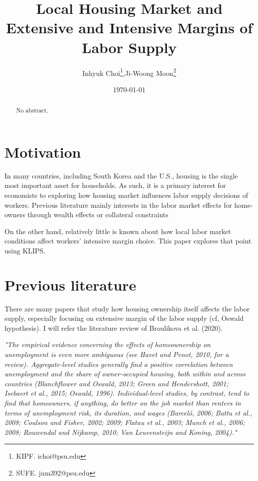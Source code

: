 \documentclass[12pt,letterpaper]{article}
\begin{document}
\title{\textbf{Local Housing Market and Extensive and Intensive Margins of Labor Supply}}%
\author{Inhyuk Choi\footnote{KIPF. ichoi@psu.edu},\quad Ji-Woong Moon\footnote{SUFE. jum392@psu.edu}}
\date{\today}
\maketitle
\begin{abstract}
No abstract.
\end{abstract}

\section{Motivation}
In many countries, including South Korea and the U.S., housing is the single most important asset for households. As such, it is a primary interest for economists to exploring how housing market influences labor supply decisions of workers. Previous literature mainly interests in the labor market effects for home-owners through wealth effects or collateral constraints

On the other hand, relatively little is known about how local labor market conditions affect workers' intensive margin choice. This paper explores that point using KLIPS. 

\bigskip
\section{Previous literature}
There are many papers that study how housing ownership itself affects the labor supply, especially focusing on extensive margin of the labor supply (cf, Oswald hypothesis). I will refer the literature review of Broulikova et al. (2020). 

\textit{\small{"The empirical evidence concerning the effects of homeownership on unemployment is even more ambiguous (see Havet and Penot, 2010, for
a review). Aggregate-level studies generally find a positive correlation
between unemployment and the share of owner-occupied housing, both
within and across countries (Blanchflower and Oswald, 2013; Green
and Hendershott, 2001; Isebaert et al., 2015; Oswald, 1996). Individual-level studies, by contrast, tend to find that homeowners, if
anything, do better on the job market than renters in terms of unemployment risk, its duration, and wages (Barceló, 2006; Battu et al.,
2008; Coulson and Fisher, 2002; 2009; Flatau et al., 2003; Munch et al.,
2006; 2008; Rouwendal and Nijkamp, 2010; Van Leuvensteijn and
Koning, 2004)."}}
\end{document}
